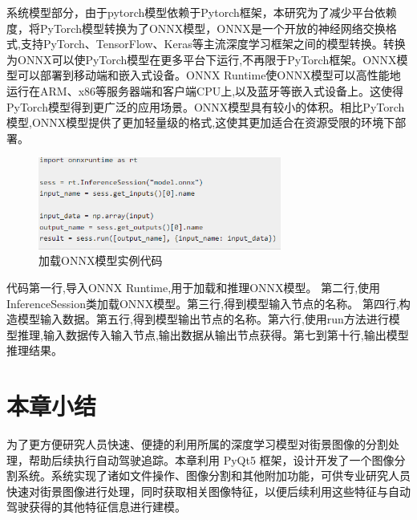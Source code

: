 系统模型部分，由于pytorch模型依赖于Pytorch框架，本研究为了减少平台依赖度，将PyTorch模型转换为了ONNX模型，ONNX是一个开放的神经网络交换格式,支持PyTorch、TensorFlow、Keras等主流深度学习框架之间的模型转换。转换为ONNX可以使PyTorch模型在更多平台下运行,不再限于PyTorch框架。ONNX模型可以部署到移动端和嵌入式设备。ONNX Runtime使ONNX模型可以高性能地运行在ARM、x86等服务器端和客户端CPU上,以及蓝牙等嵌入式设备上。这使得PyTorch模型得到更广泛的应用场景。ONNX模型具有较小的体积。相比PyTorch模型,ONNX模型提供了更加轻量级的格式,这使其更加适合在资源受限的环境下部署。
\begin{figure}[htb]
    \centering
    \includegraphics[width=8cm]{fig/chap4/代码图.png}
    \caption{加载ONNX模型实例代码}
    \label{fig:f4e}
\end{figure}

代码第一行,导入ONNX Runtime,用于加载和推理ONNX模型。 第二行,使用InferenceSession类加载ONNX模型。第三行,得到模型输入节点的名称。 第四行,构造模型输入数据。第五行,得到模型输出节点的名称。第六行,使用run方法进行模型推理,输入数据传入输入节点,输出数据从输出节点获得。第七到第十行,输出模型推理结果。



\section{本章小结}
为了更方便研究人员快速、便捷的利用所属的深度学习模型对街景图像的分割处理，帮助后续执行自动驾驶追踪。本章利用 PyQt5 框架，设计开发了一个图像分割系统。系统实现了诸如文件操作、图像分割和其他附加功能，可供专业研究人员快速对街景图像进行处理，同时获取相关图像特征，以便后续利用这些特征与自动驾驶获得的其他特征信息进行建模。
